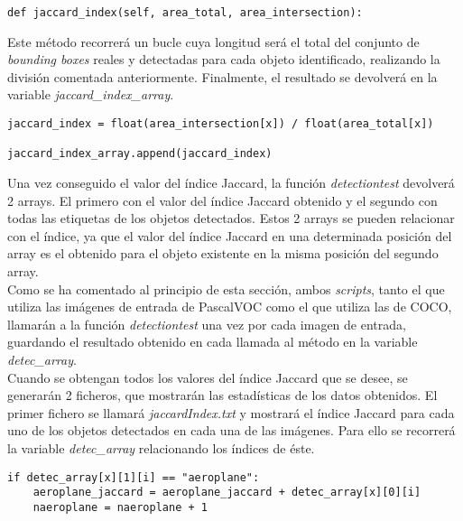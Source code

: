 \documentclass[a4paper, 12pt, spanish, chapterprefix, numbers=noenddot]{book}
\begin{document}
\begin{lstlisting}[frame=single]
def jaccard_index(self, area_total, area_intersection):
\end{lstlisting}

Este método recorrerá un bucle cuya longitud será el total del conjunto de \textit{bounding boxes} reales y detectadas para cada objeto identificado, realizando la división comentada anteriormente. Finalmente, el resultado se devolverá en la variable \textit{jaccard\_index\_array}.\\

\begin{lstlisting}[frame=single]
jaccard_index = float(area_intersection[x]) / float(area_total[x])

jaccard_index_array.append(jaccard_index)
\end{lstlisting}

Una vez conseguido el valor del índice Jaccard, la función \textit{detectiontest} devolverá 2 arrays. El primero con el valor del índice Jaccard obtenido y el segundo con todas las etiquetas de los objetos detectados. Estos 2 arrays se pueden relacionar con el índice, ya que el valor del índice Jaccard en una determinada posición del array es el obtenido para el objeto existente en la misma posición del segundo array.\\

Como se ha comentado al principio de esta sección, ambos \textit{scripts}, tanto el que utiliza las imágenes de entrada de PascalVOC como el que utiliza las de COCO, llamarán a la función \textit{detectiontest} una vez por cada imagen de entrada, guardando el resultado obtenido en cada llamada al método en la variable \textit{detec\_array}.\\

Cuando se obtengan todos los valores del índice Jaccard que se desee, se generarán 2 ficheros, que mostrarán las estadísticas de los datos obtenidos. El primer fichero se llamará \textit{jaccardIndex.txt} y mostrará el índice Jaccard para cada uno de los objetos detectados en cada una de las imágenes. Para ello se recorrerá la variable \textit{detec\_array} relacionando los índices de éste.\\

\begin{lstlisting}[frame=single]
if detec_array[x][1][i] == "aeroplane":
	aeroplane_jaccard = aeroplane_jaccard + detec_array[x][0][i]
	naeroplane = naeroplane + 1
\end{lstlisting}
\end{document}
